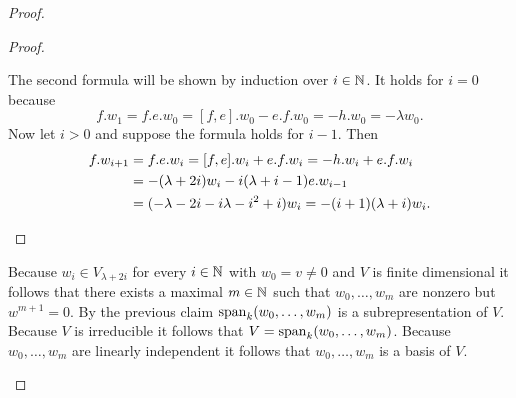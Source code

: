 \begin{proof}
\begin{enumerate}[leftmargin=*]
\begin{proof}
\begin{enumerate}[leftmargin=*]
      The second formula will be shown by induction over $i \in \mathbb{N}$. It holds for $i = 0$ because
      \[
       f.w_1
       = f.e.w_0
       = [f,e].w_0 - e.f.w_0
       = -h.w_0
       = -\lambda w_0.
      \]
      Now let $i > 0$ and suppose the formula holds for $i-1$. Then
      \begin{align*}
       f.w_{i+1}
       &= f.e.w_i
       = [f,e].w_i + e.f.w_i
       = -h.w_i + e.f.w_i \\
       &= -(\lambda+2i) w_i -i(\lambda+i-1) e.w_{i-1} \\
       &= (-\lambda -2i -i\lambda -i^2 +i) w_i
       =  -(i+1)(\lambda+i) w_i.
      \qedhere
      \end{align*}
     \qedhere
    \end{enumerate}
   \end{proof}
   
   Because $w_i \in V_{\lambda+2i}$ for every $i \in \mathbb{N}$ with $w_0 = v \neq 0$ and $V$ is finite dimensional it follows that there exists a maximal $m \in \mathbb{N}$ such that $w_0, \dotsc, w_m$ are nonzero but $w^{m+1} = 0$. By the previous claim $\operatorname{span}_k(w_0, \dotsc, w_m)$ is a subrepresentation of $V$. Because $V$ is irreducible it follows that $V = \operatorname{span}_k(w_0, \dotsc, w_m)$. Because $w_0, \dotsc, w_m$ are linearly independent it follows that $w_0, \dotsc, w_m$ is a basis of $V$.
   

\end{enumerate}
\end{proof}
